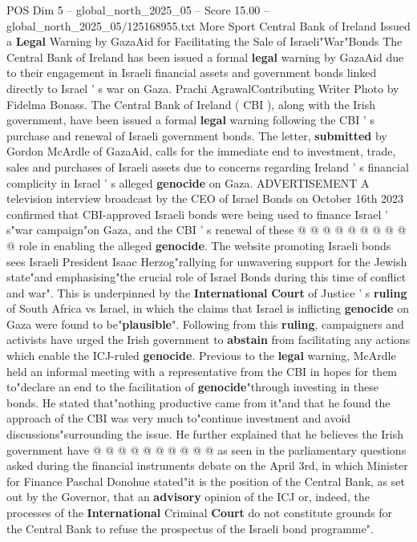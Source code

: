 \begin{textsample}{POS Dim 5 – global\_north\_2025\_05 – Score 15.00 – global\_north\_2025\_05/125168955.txt}  \label{ex:f5_pos_133}
More Sport Central Bank of Ireland Issued a \textbf{Legal} Warning by GazaAid for Facilitating the Sale of Israeli"War"Bonds The Central Bank of Ireland has been issued a formal \textbf{legal} warning by GazaAid due to their engagement in Israeli financial assets and government bonds linked directly to Israel ' s war on Gaza.
Prachi AgrawalContributing Writer Photo by Fidelma Bonass.
The Central Bank of Ireland ( CBI ), along with the Irish government, have been issued a formal \textbf{legal} warning following the CBI ' s purchase and renewal of Israeli government bonds.
The letter, \textbf{submitted} by Gordon McArdle of GazaAid, calls for the immediate end to investment, trade, sales and purchases of Israeli assets due to concerns regarding Ireland ' s financial complicity in Israel ' s alleged \textbf{genocide} on Gaza.
ADVERTISEMENT A television interview broadcast by the CEO of Israel Bonds on October 16th 2023 confirmed that CBI-approved Israeli bonds were being used to finance Israel ' s"war campaign"on Gaza, and the CBI ' s renewal of these @ @ @ @ @ @ @ @ @ @ role in enabling the alleged \textbf{genocide}.
The website promoting Israeli bonds sees Israeli President Isaac Herzog"rallying for unwavering support for the Jewish state"and emphasising"the crucial role of Israel Bonds during this time of conflict and war".
This is underpinned by the \textbf{International} \textbf{Court} of Justice ' s \textbf{ruling} of South Africa vs Israel, in which the claims that Israel is inflicting \textbf{genocide} on Gaza were found to be"\textbf{plausible}".
Following from this \textbf{ruling}, campaigners and activists have urged the Irish government to \textbf{abstain} from facilitating any actions which enable the ICJ-ruled \textbf{genocide}.
Previous to the \textbf{legal} warning, McArdle held an informal meeting with a representative from the CBI in hopes for them to"declare an end to the facilitation of \textbf{genocide}"through investing in these bonds.
He stated that"nothing productive came from it"and that he found the approach of the CBI was very much to"continue investment and avoid discussions"surrounding the issue.
He further explained that he believes the Irish government have @ @ @ @ @ @ @ @ @ @ as seen in the parliamentary questions asked during the financial instruments debate on the April 3rd, in which Minister for Finance Paschal Donohue stated"it is the position of the Central Bank, as set out by the Governor, that an \textbf{advisory} opinion of the ICJ or, indeed, the processes of the \textbf{International} Criminal \textbf{Court} do not constitute grounds for the Central Bank to refuse the prospectus of the Israeli bond programme".

\end{textsample}
